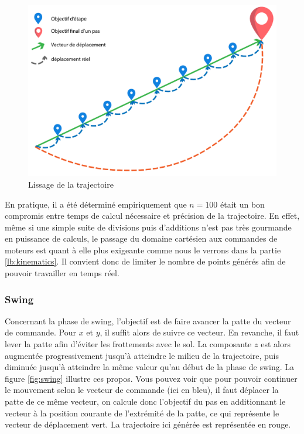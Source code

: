 \documentclass{tnreport}
\begin{document}
\begin{figure}[h]
\centering
\includegraphics[width = 15cm]{figures/traj}
\caption{Lissage de la trajectoire}
\label{fig:traj}
\end{figure}
En pratique, il a été déterminé empiriquement que $n=100$ était un bon compromis entre temps de calcul nécessaire et précision de la trajectoire. En effet, même si une simple suite de divisions puis d'additions n'est pas très gourmande en puissance de calculs, le passage du domaine cartésien aux commandes de moteurs est quant à elle plus exigeante comme nous le verrons dans la partie \ref{lb:kinematics}. Il convient donc de limiter le nombre de points générés afin de pouvoir travailler en temps réel. 

\subsubsection{Swing}

Concernant la phase de swing, l'objectif est de faire avancer la patte du vecteur de commande. Pour $x$ et $y$, il suffit alors de suivre ce vecteur. En revanche, il faut lever la patte afin d'éviter les frottements avec le sol. La composante $z$ est alors augmentée progressivement jusqu'à atteindre le milieu de la trajectoire, puis diminuée jusqu'à atteindre la même valeur qu'au début de la phase de swing. La figure \ref{fig:swing} illustre ces propos. Vous pouvez voir que pour pouvoir continuer le mouvement selon le vecteur de commande (ici en bleu), il faut déplacer la patte de ce même vecteur, on calcule donc l'objectif du pas en additionnant le vecteur à la position courante de l'extrémité de la patte, ce qui représente le vecteur de déplacement vert. La trajectoire ici générée est représentée en rouge.
\end{document}
